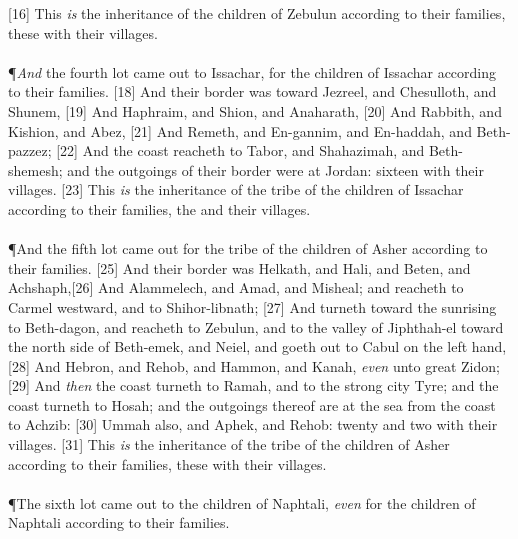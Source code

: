 [16] \textcolor[cmyk]{0.99998,1,0,0}{This \emph{is} the inheritance of the children of Zebulun according to their families, these  with their villages.}\\
\\
\P \textcolor[cmyk]{0.99998,1,0,0}{\emph{And} the fourth lot came out to Issachar, for the children of Issachar according to their families.}
[18] \textcolor[cmyk]{0.99998,1,0,0}{And their border was toward Jezreel, and Chesulloth, and Shunem,}
[19] \textcolor[cmyk]{0.99998,1,0,0}{And Haphraim, and Shion, and Anaharath,}
[20] \textcolor[cmyk]{0.99998,1,0,0}{And Rabbith, and Kishion, and Abez,}
[21] \textcolor[cmyk]{0.99998,1,0,0}{And Remeth, and En-gannim, and En-haddah, and Beth-pazzez;}
[22] \textcolor[cmyk]{0.99998,1,0,0}{And the coast reacheth to Tabor, and Shahazimah, and Beth-shemesh; and the outgoings of their border were at Jordan: sixteen  with their villages.}
[23] \textcolor[cmyk]{0.99998,1,0,0}{This \emph{is} the inheritance of the tribe of the children of Issachar according to their families, the  and their villages.}\\
\\
\P \textcolor[cmyk]{0.99998,1,0,0}{And the fifth lot came out for the tribe of the children of Asher according to their families.}
[25] \textcolor[cmyk]{0.99998,1,0,0}{And their border was Helkath, and Hali, and Beten, and Achshaph,}[26] \textcolor[cmyk]{0.99998,1,0,0}{And Alammelech, and Amad, and Misheal; and reacheth to Carmel westward, and to Shihor-libnath;}
[27] \textcolor[cmyk]{0.99998,1,0,0}{And turneth toward the sunrising to Beth-dagon, and reacheth to Zebulun, and to the valley of Jiphthah-el toward the north side of Beth-emek, and Neiel, and goeth out to Cabul on the left hand,}
[28] \textcolor[cmyk]{0.99998,1,0,0}{And Hebron, and Rehob, and Hammon, and Kanah, \emph{even} unto great Zidon;}
[29] \textcolor[cmyk]{0.99998,1,0,0}{And \emph{then} the coast turneth to Ramah, and to the strong city Tyre; and the coast turneth to Hosah; and the outgoings thereof are at the sea from the coast to Achzib:}
[30] \textcolor[cmyk]{0.99998,1,0,0}{Ummah also, and Aphek, and Rehob: twenty and two  with their villages.}
[31] \textcolor[cmyk]{0.99998,1,0,0}{This \emph{is} the inheritance of the tribe of the children of Asher according to their families, these  with their villages.}\\
\\
\P \textcolor[cmyk]{0.99998,1,0,0}{The sixth lot came out to the children of Naphtali, \emph{even} for the children of Naphtali according to their families.}
